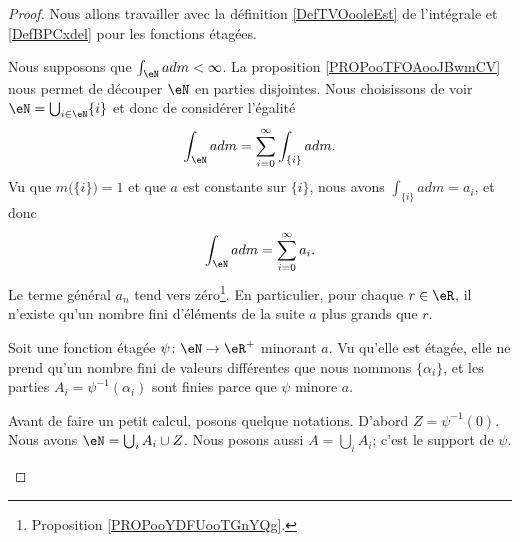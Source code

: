\begin{proof}
	Nous allons travailler avec la définition \ref{DefTVOooleEst} de l'intégrale et \ref{DefBPCxdel} pour les fonctions étagées.

	\begin{subproof}
		Nous supposons que \( \int_{\eN}adm<\infty\). La proposition \ref{PROPooTFOAooJBwmCV} nous permet de découper \( \eN\) en parties disjointes. Nous choisissons de voir \( \eN=\bigcup_{i\in \eN}\{ i \}\) et donc de considérer l'égalité
		\begin{equation}
			\int_{\eN}adm=\sum_{i=0}^{\infty}\int_{\{ i \}}adm.
		\end{equation}
		Vu que \( m\big( \{ i \} \big)=1\) et que \( a\) est constante sur \( \{ i \}\), nous avons \( \int_{\{ i \}}adm=a_i\), et donc
		\begin{equation}
			\int_{\eN}adm=\sum_{i=0}^{\infty}a_i.
		\end{equation}
		Le terme général \( a_n\) tend vers zéro\footnote{Proposition \ref{PROPooYDFUooTGnYQg}.}. En particulier, pour chaque \( r\in \eR\), il n'existe qu'un nombre fini d'éléments de la suite \( a\) plus grands que \( r\).

		Soit une fonction étagée \( \psi\colon \eN\to \eR^+\) minorant \( a\). Vu qu'elle est étagée, elle ne prend qu'un nombre fini de valeurs différentes que nous nommons \( \{ \alpha_i \}\), et les parties \( A_i=\psi^{-1}(\alpha_i)\) sont finies parce que \( \psi\) minore \( a\).

		Avant de faire un petit calcul, posons quelque notations. D'abord \( Z=\psi^{-1}(0)\). Nous avons \( \eN=\bigcup_{i}A_i \cup Z\). Nous posons aussi \( A=\bigcup_iA_i\); c'est le support de \( \psi\).


\end{subproof}
\end{proof}
